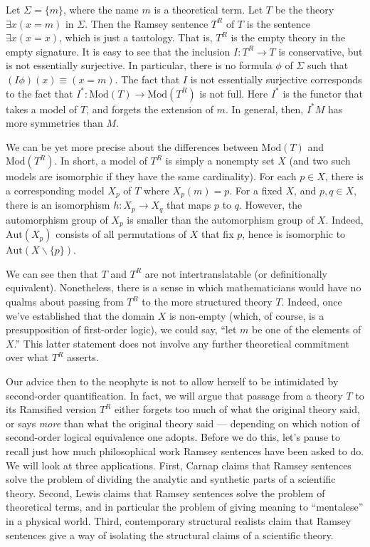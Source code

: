 \begin{example} Let $\Sigma =\{ m\}$, where the name $m$ is a
  theoretical term.  Let $T$ be the theory $\exists x(x=m)$ in
  $\Sigma$.  Then the Ramsey sentence $T^R$ of $T$ is the sentence
  $\exists x(x=x)$, which is just a tautology.  That is, $T^R$ is the
  empty theory in the empty signature.  It is easy to see that the
  inclusion $I:T^R\to T$ is conservative, but is not essentially
  surjective.  In particular, there is no formula $\phi$ of $\Sigma$
  such that $(I\phi )(x)\equiv (x=m)$.  The fact that $I$ is not
  essentially surjective corresponds to the fact that
  $I^*:\mathrm{Mod}(T)\to \mathrm{Mod}(T^R)$ is not full.  Here $I^*$
  is the functor that takes a model of $T$, and forgets the extension
  of $m$.  In general, then, $I^*M$ has more symmetries than $M$.

  We can be yet more precise about the differences between
  $\mathrm{Mod}(T)$ and $\mathrm{Mod}(T^R)$.  In short, a model of
  $T^R$ is simply a nonempty set $X$ (and two such models are
  isomorphic if they have the same cardinality).  For each $p\in X$,
  there is a corresponding model $X_p$ of $T$ where $X_p(m)=p$.  For a
  fixed $X$, and $p,q\in X$, there is an isomorphism $h:X_p\to X_q$
  that maps $p$ to $q$.  However, the automorphism group of $X_p$ is
  smaller than the automorphism group of $X$.  Indeed,
  $\mathrm{Aut} (X_p)$ consists of all permutations of $X$ that fix
  $p$, hence is isomorphic to $\mathrm{Aut}(X\backslash \{
  p\})$.

  We can see then that $T$ and $T^R$ are not intertranslatable (or
  definitionally equivalent).  Nonetheless, there is a sense in which
  mathematicians would have no qualms about passing from $T^R$ to the
  more structured theory $T$.  Indeed, once we've established that the
  domain $X$ is non-empty (which, of course, is a presupposition of
  first-order logic), we could say, ``let $m$ be one of the elements
  of $X$.'' This latter statement does not involve any further
  theoretical commitment over what $T^R$ asserts.  \end{example}

Our advice then to the neophyte is not to allow herself to be
intimidated by second-order quantification.  In fact, we will argue
that passage from a theory $T$ to its Ramsified version $T^R$ either
forgets too much of what the original theory said, or says {\it more}
than what the original theory said --- depending on which notion of
second-order logical equivalence one adopts.  Before we do this, let's
pause to recall just how much philosophical work Ramsey sentences have
been asked to do.  We will look at three applications.  First, Carnap
claims that Ramsey sentences solve the problem of dividing the
analytic and synthetic parts of a scientific theory.  Second, Lewis
claims that Ramsey sentences solve the problem of theoretical terms,
and in particular the problem of giving meaning to ``mentalese'' in a
physical world.  Third, contemporary structural realists claim that
Ramsey sentences give a way of isolating the structural claims of a
scientific theory.

